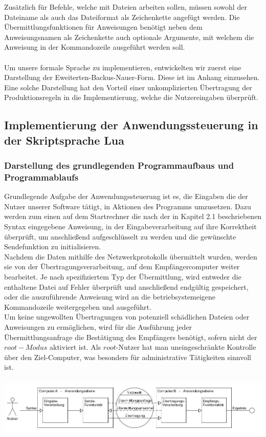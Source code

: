 Zusätzlich für Befehle, welche mit Dateien arbeiten sollen, müssen sowohl der Dateiname als auch das Dateiformat als Zeichenkette angefügt werden. 
Die Übermittlungsfunktionen für Anweisungen benötigt neben dem Anweisungsnamen als Zeichenkette auch optionale Argumente, mit welchem die Anweisung in der Kommandozeile ausgeführt werden soll.\\\\
Um unsere formale Sprache zu implementieren, entwickelten wir zuerst eine Darstellung der Eweiterten-Backus-Nauer-Form. Diese ist im Anhang einzusehen. Eine solche Darstellung hat den Vorteil einer unkomplizierten Übertragung der Produktionsregeln in die Implementierung, welche die Nutzereingaben überprüft.

\subsection{Implementierung der Anwendungssteuerung in der Skriptsprache Lua}

\subsubsection{Darstellung des grundlegenden Programmaufbaus und Programmablaufs}
Grundlegende Aufgabe der Anwendungssteuerung ist es, die Eingaben die der Nutzer unserer Software tätigt, in Aktionen des Programms umzusetzen. 
Dazu werden zum einen auf dem Startrechner die nach der in Kapitel 2.1 beschriebenen Syntax eingegebene Anweisung, in der Eingabeverarbeitung auf ihre Korrektheit überprüft, um anschließend aufgeschlüsselt zu werden und die gewünschte Sendefunktion zu initialisieren.\\
Nachdem die Daten mithilfe des Netzwerkprotokolls übermittelt wurden, werden sie von der Übertragungsverarbeitung, auf dem Empfängercomputer weiter bearbeitet. Je nach spezifiziertem Typ der Übermittlung, wird entweder die enthaltene Datei auf Fehler überprüft und anschließend endgültig gespeichert, oder die auszuführende Anweisung wird an die betriebsystemeigene Kommandozeile weitergegeben und ausgeführt.\\
Um keine ungewollten Übertragungen von potenziell schädlichen Dateien oder Anweisungen zu ermöglichen, wird für die Ausführung jeder Übermittlungsanfrage die Bestätigung des Empfängers benötigt, sofern nicht der $root-Modus$ aktiviert ist. Als $root$-Nutzer hat man uneingeschränkte Kontrolle über den Ziel-Computer, was besonders für administrative Tätigkeiten sinnvoll ist.\\\hfill\\ 
\includegraphics[scale=.45]{anw.jpg}
